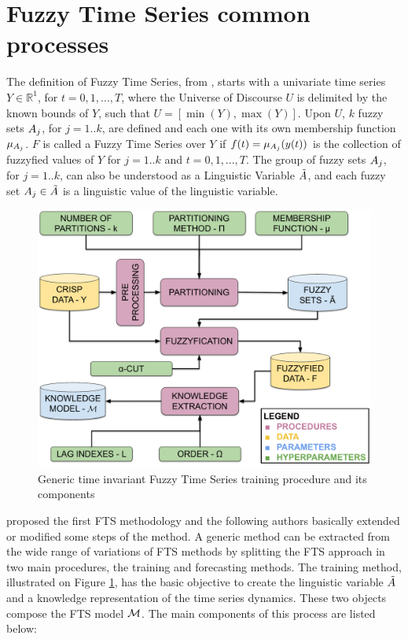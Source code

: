 \section{Fuzzy Time Series common processes}
\label{sec:common_fts} 


The definition of Fuzzy Time Series, from \cite{song1993fuzzy}, starts with a univariate time series $Y \in \mathbb{R}^1$, for $t = 0,1,...,T$, where the Universe of Discourse $U$ is delimited by the known bounds of $Y$, such that $U = [\min(Y),\max(Y)]$. Upon $U$, $k$ fuzzy sets $A_j$, for $j = 1..k$, are defined and each one with its own membership function $\mu_{A_j}$. $F$ is called a Fuzzy Time Series over $Y$ if $f(t) = \mu_{A_j}(y(t))$ is the collection of fuzzyfied values of $Y$ for $j = 1..k$ and $t = 0,1,...,T$. The group of fuzzy sets $A_j$, for $j = 1..k$, can also be understood as a Linguistic Variable $\tilde{A}$, and each fuzzy set $A_j \in \tilde{A}$ is a linguistic value of the linguistic variable. 

\begin{figure}
    \centering
    \includegraphics[width=\textwidth]{figures/fts_training.pdf}
    \caption{Generic time invariant Fuzzy Time Series training procedure and its components}
    \label{fig:fts_training}
\end{figure}

\cite{Song1993partI} proposed the first FTS methodology and the following authors basically extended or modified some steps of the method. A generic method can be extracted from the wide range of variations of FTS methods by splitting the FTS approach in two main procedures, the training and forecasting methods. The training method, illustrated on Figure \ref{fig:fts_training}, has the basic objective to create the linguistic variable $\tilde{A}$ and a knowledge representation of the time series dynamics. These two objects compose the FTS model $\mathcal{M}$. The main components of this process are listed below:


